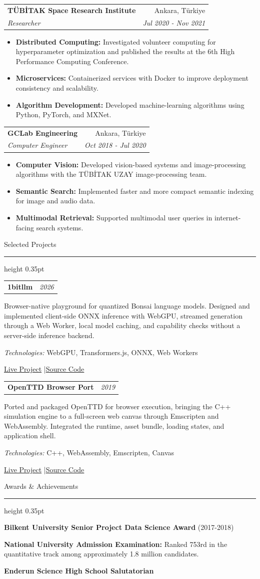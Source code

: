 \documentclass[10pt,a4paper]{article}
\makeatletter
\newcommand{\cvsection}[1]{%
  \vspace{0.62em}%
  {\sectionfont\fontsize{13.2}{15}\selectfont #1}\par
  \vspace{0.10em}\hrule height 0.35pt
  \vspace{0.42em}%
}
\newcommand{\experienceentry}[5]{%
  \begin{tabularx}{\textwidth}{@{}Xr@{}}
    \textbf{#1} & #3 \\
    \textit{#2} & \textit{#4}
  \end{tabularx}
  \vspace{-0.30em}
  \begin{itemize}[leftmargin=1.50em,label=\textbullet,itemsep=0.08em,topsep=0.18em,parsep=0pt,partopsep=0pt]
    #5
  \end{itemize}
  \vspace{0.08em}%
}
\newcommand{\projectentry}[5]{%
  \begin{tabularx}{\textwidth}{@{}Xr@{}}
    \textbf{#1} & \textit{#2}
  \end{tabularx}
  \vspace{-0.18em}
  #3\par
  \vspace{0.16em}
  \textit{Technologies:} #4\par
  \vspace{0.12em}
  #5
  \vspace{0.48em}%
}
\makeatother
\begin{document}
\experienceentry
  {TÜBİTAK Space Research Institute}
  {Researcher}
  {Ankara, Türkiye}
  {Jul 2020 - Nov 2021}
  {
    \item \textbf{Distributed Computing:} Investigated volunteer computing for hyperparameter optimization and published the results at the 6th High Performance Computing Conference.
    \item \textbf{Microservices:} Containerized services with Docker to improve deployment consistency and scalability.
    \item \textbf{Algorithm Development:} Developed machine-learning algorithms using Python, PyTorch, and MXNet.
  }

\experienceentry
  {GCLab Engineering}
  {Computer Engineer}
  {Ankara, Türkiye}
  {Oct 2018 - Jul 2020}
  {
    \item \textbf{Computer Vision:} Developed vision-based systems and image-processing algorithms with the TÜBİTAK UZAY image-processing team.
    \item \textbf{Semantic Search:} Implemented faster and more compact semantic indexing for image and audio data.
    \item \textbf{Multimodal Retrieval:} Supported multimodal user queries in internet-facing search systems.
  }

\newpage

\cvsection{Selected Projects}
\projectentry
  {1bitllm}
  {2026}
  {Browser-native playground for quantized Bonsai language models. Designed and implemented client-side ONNX inference with WebGPU, streamed generation through a Web Worker, local model caching, and capability checks without a server-side inference backend.}
  {WebGPU, Transformers.js, ONNX, Web Workers}
  {\href{https://atalbayrak.github.io/1bitllm/}{Live Project} \enspace|\enspace \href{https://github.com/atalbayrak/1bitllm}{Source Code}}

\projectentry
  {OpenTTD Browser Port}
  {2019}
  {Ported and packaged OpenTTD for browser execution, bringing the C++ simulation engine to a full-screen web canvas through Emscripten and WebAssembly. Integrated the runtime, asset bundle, loading states, and application shell.}
  {C++, WebAssembly, Emscripten, Canvas}
  {\href{https://atalbayrak.github.io/openttd/}{Live Project} \enspace|\enspace \href{https://github.com/atalbayrak/openttd}{Source Code}}

\cvsection{Awards \& Achievements}
\textbf{Bilkent University Senior Project Data Science Award} (2017-2018)\par
\vspace{0.26em}
\textbf{National University Admission Examination:} Ranked 753rd in the quantitative track among approximately 1.8 million candidates.\par
\vspace{0.26em}
\textbf{Enderun Science High School Salutatorian}
\end{document}
